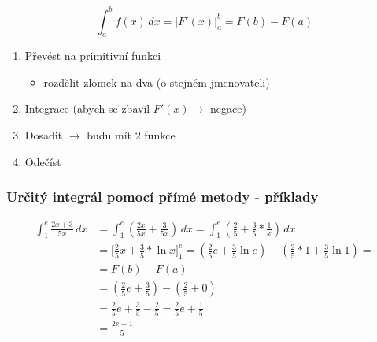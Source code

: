 \begin{equation}
\int_{a}^{b}f(x)\,dx = \Bigr[ F'(x) \Bigr]_a^b=F(b)-F(a)
\end{equation}

\begin{enumerate}
  \item Převést na primitivní funkci
    \begin{itemize}
      \item rozdělit zlomek na dva (o stejném jmenovateli)
    \end{itemize}
  \item Integrace (abych se zbavil $F'(x)\rightarrow$ negace)
  \item Dosadit $\rightarrow$ budu mít 2 funkce
  \item Odečíst
\end{enumerate}
\subsubsection{Určitý integrál pomocí přímé metody - příklady}
\begin{align*}
  \int^e_1\frac{2x+3}{5x}\,dx&=\int^e_1(\frac{2x}{5x}+\frac{3}{5x})\,dx=\int^e_1(\frac{2}{5}+\frac{3}{5}*\frac{1}{x})\,dx \\
  &=\biggr[\frac{2}{5}x+\frac{3}{5}*\ln{x}\biggr]^e_1=(\frac{2}{5}e+\frac{3}{5}\ln{e})-(\frac{2}{5}*1+\frac{3}{5}\ln{1})= \\
  &=F(b)-F(a)\\
  &=(\frac{2}{5}e+\frac{3}{5})-(\frac{2}{5}+0)\\
  &=\frac{2}{5}e+\frac{3}{5}-\frac{2}{5}=\frac{2}{5}e+\frac{1}{5} \\
  &=\frac{2e+1}{5}
\end{align*}
